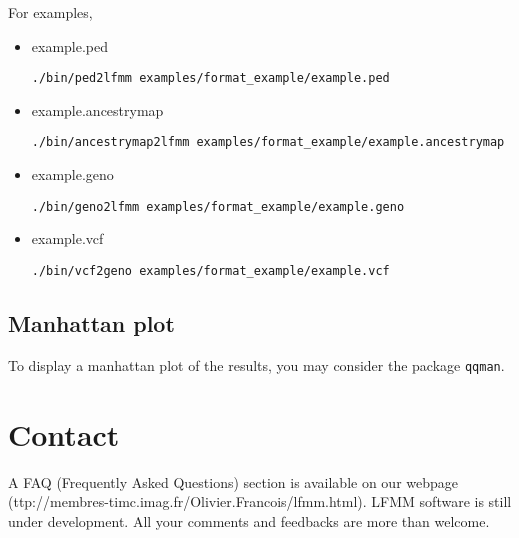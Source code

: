 \documentclass[10pt,a4paper]{article}
\begin{document}
\noindent
For examples,
\begin{itemize}
\item example.ped
\begin{Verbatim}[frame=single]
./bin/ped2lfmm examples/format_example/example.ped
\end{Verbatim}
\item example.ancestrymap
\begin{Verbatim}[frame=single]
./bin/ancestrymap2lfmm examples/format_example/example.ancestrymap
\end{Verbatim}
\item example.geno
\begin{Verbatim}[frame=single]
./bin/geno2lfmm examples/format_example/example.geno
\end{Verbatim}
\item example.vcf
\begin{Verbatim}[frame=single]
./bin/vcf2geno examples/format_example/example.vcf
\end{Verbatim}
\end{itemize}

\subsection{Manhattan plot}

To display a manhattan plot of the results, you may consider the package {\tt qqman}.

\section{Contact}
A FAQ (Frequently Asked Questions) section is available 
on our webpage (ttp://membres-timc.imag.fr/Olivier.Francois/lfmm.html). 
LFMM software is still under development. 
All your comments and feedbacks are more than welcome.



\end{document}
